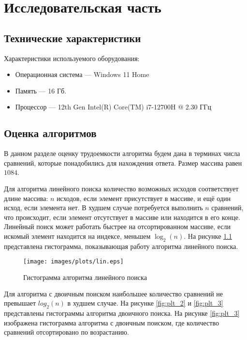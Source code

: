 \chapter{Исследовательская часть}

\section{Технические характеристики}
Характеристики используемого оборудования:
\begin{itemize}
    \item Операционная система --- Windows 11 Home \cite{windows}
    \item Память --- 16 Гб.
    \item Процессор --- 12th Gen Intel(R) Core(TM) i7-12700H @  2.30 ГГц \cite{intel}
\end{itemize}

\section{Оценка алгоритмов}
В данном разделе оценку трудоемкости алгоритма будем дана в терминах числа сравнений, которые понадобились
для нахождения ответа. Размер массива равен $1084$.

\medskip

Для алгоритма линейного поиска количество возможных исходов соответствует длине массива: $n$ исходов, если элемент присутствует в массиве, и ещё один исход, если элемента нет. В худшем случае потребуется выполнить $n$ сравнений, что происходит, если элемент отсутствует в массиве или находится в его конце. Линейный поиск может работать быстрее на отсортированном массиве, если искомый элемент находится на индексе, меньшем $\log_2(n)$. На рисунке \ref{fig:plt_1} представлена гистограмма, показывающая работу алгоритма линейного поиска.

\begin{figure}[h]
    \centering
    \texttt{[image: images/plots/lin.eps]}
    \caption{Гистограмма алгоритма линейного поиска}
    \label{fig:plt_1}
\end{figure}

\clearpage

Для алгоритма с двоичным поиском наибольшее количество сравнений не превышает $log_2(n)$ в худшем случае. На рисунке \ref{fig:plt_2} и \ref{fig:plt_3} представлены гистограммы алгоритма двоичного поиска. На рисунке \ref{fig:plt_3} изображена гистограмма алгоритма с двоичным поиском, где количество сравнений отсортировано по возрастанию.

